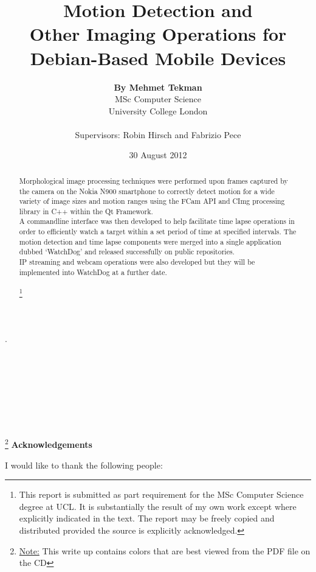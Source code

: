 \documentclass[11pt]{article} %
\title{\Huge Motion Detection and\\Other Imaging Operations for\\Debian-Based Mobile Devices }
\date{30 August 2012}
\author{{\bf By Mehmet Tekman}\\\small MSc Computer Science\\\small University College London\\\\
\large Supervisors: Robin Hirsch and Fabrizio Pece}
\newcommand{\tab}{\hspace*{2em}}
\begin{document}
\maketitle 

\part*{}{\tiny.\\\\\\\\\\\\\\\\}
\begin{abstract}
Morphological image processing techniques were performed upon frames captured by the camera on the Nokia N900 smartphone to correctly detect motion for a wide variety of image sizes and motion ranges using the FCam API and CImg processing library in C++ within the Qt Framework.\\\tab A commandline interface was then developed to help facilitate time lapse operations in order to efficiently watch a target within a set period of time at specified intervals. The motion detection and time lapse components were merged into a single application dubbed ‘WatchDog’ and released successfully on public repositories.\\\tab IP streaming and webcam operations were also developed but they will be implemented into WatchDog at a further date.
\\\\\let\thefootnote\relax\footnote{This report is submitted as part requirement for the MSc Computer Science degree at UCL. It is substantially the result of my own work except where explicitly indicated in the text. The report may be freely copied and distributed provided the source is explicitly acknowledged.}
\end{abstract}
\pagebreak
\tableofcontents
\begin{center}
\vspace*{\fill}
\footnote{\underline{Note:} This write up contains colors that are best viewed from the PDF file on the CD}
{\bf Acknowledgements}\\
\end{center}
I would like to thank the following people:
\end{document}
